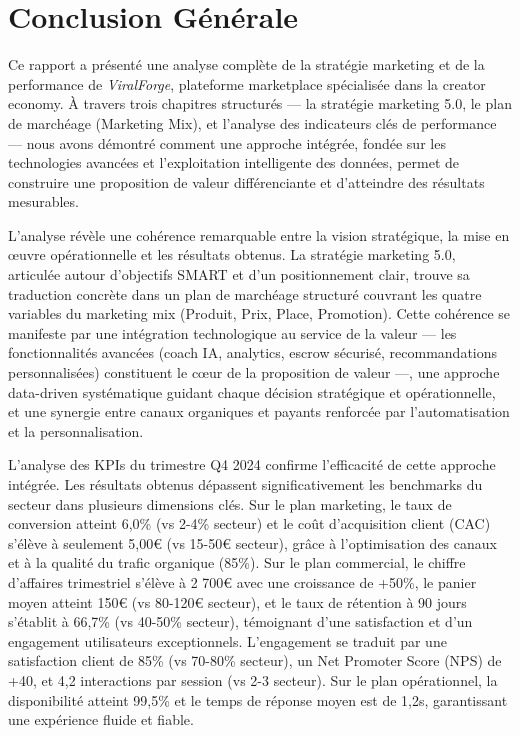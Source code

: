 \chapter*{Conclusion Générale}

Ce rapport a présenté une analyse complète de la stratégie marketing et de la performance de \textit{ViralForge}, plateforme marketplace spécialisée dans la creator economy. À travers trois chapitres structurés — la stratégie marketing 5.0, le plan de marchéage (Marketing Mix), et l'analyse des indicateurs clés de performance — nous avons démontré comment une approche intégrée, fondée sur les technologies avancées et l'exploitation intelligente des données, permet de construire une proposition de valeur différenciante et d'atteindre des résultats mesurables.

L'analyse révèle une cohérence remarquable entre la vision stratégique, la mise en œuvre opérationnelle et les résultats obtenus. La stratégie marketing 5.0, articulée autour d'objectifs SMART et d'un positionnement clair, trouve sa traduction concrète dans un plan de marchéage structuré couvrant les quatre variables du marketing mix (Produit, Prix, Place, Promotion). Cette cohérence se manifeste par une intégration technologique au service de la valeur — les fonctionnalités avancées (coach IA, analytics, escrow sécurisé, recommandations personnalisées) constituent le cœur de la proposition de valeur —, une approche data-driven systématique guidant chaque décision stratégique et opérationnelle, et une synergie entre canaux organiques et payants renforcée par l'automatisation et la personnalisation.

L'analyse des KPIs du trimestre Q4 2024 confirme l'efficacité de cette approche intégrée. Les résultats obtenus dépassent significativement les benchmarks du secteur dans plusieurs dimensions clés. Sur le plan marketing, le taux de conversion atteint 6,0\% (vs 2-4\% secteur) et le coût d'acquisition client (CAC) s'élève à seulement 5,00€ (vs 15-50€ secteur), grâce à l'optimisation des canaux et à la qualité du trafic organique (85\%). Sur le plan commercial, le chiffre d'affaires trimestriel s'élève à 2 700€ avec une croissance de +50\%, le panier moyen atteint 150€ (vs 80-120€ secteur), et le taux de rétention à 90 jours s'établit à 66,7\% (vs 40-50\% secteur), témoignant d'une satisfaction et d'un engagement utilisateurs exceptionnels. L'engagement se traduit par une satisfaction client de 85\% (vs 70-80\% secteur), un Net Promoter Score (NPS) de +40, et 4,2 interactions par session (vs 2-3 secteur). Sur le plan opérationnel, la disponibilité atteint 99,5\% et le temps de réponse moyen est de 1,2s, garantissant une expérience fluide et fiable.


